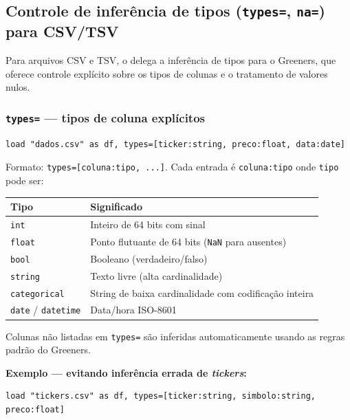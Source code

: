 \subsection*{Controle de inferência de tipos (\texttt{types=}, \texttt{na=}) para CSV/TSV}

Para arquivos CSV e TSV, o \hayashi{} delega a inferência de tipos para o Greeners,
que oferece controle explícito sobre os tipos de colunas e o tratamento de valores
nulos.

\subsubsection*{\texttt{types=} --- tipos de coluna explícitos}

\begin{lstlisting}[caption={Tipos de coluna explícitos}]
load "dados.csv" as df, types=[ticker:string, preco:float, data:date]
\end{lstlisting}

Formato: \texttt{types=[coluna:tipo, ...]}. Cada entrada é \texttt{coluna:tipo}
onde \texttt{tipo} pode ser:

\begin{center}
\begin{tabular}{ll}
\toprule
\textbf{Tipo} & \textbf{Significado} \\
\midrule
\texttt{int}       & Inteiro de 64 bits com sinal \\
\texttt{float}    & Ponto flutuante de 64 bits (\texttt{NaN} para ausentes) \\
\texttt{bool}     & Booleano (verdadeiro/falso) \\
\texttt{string}   & Texto livre (alta cardinalidade) \\
\texttt{categorical} & String de baixa cardinalidade com codificação inteira \\
\texttt{date} / \texttt{datetime} & Data/hora ISO-8601 \\
\bottomrule
\end{tabular}
\end{center}

Colunas não listadas em \texttt{types=} são inferidas automaticamente usando as
regras padrão do Greeners.

\textbf{Exemplo --- evitando inferência errada de \textit{tickers}:}

\begin{lstlisting}[caption={Forçando \textit{ticker} e \textit{símbolo} como string}]
load "tickers.csv" as df, types=[ticker:string, simbolo:string, preco:float]
\end{lstlisting}

